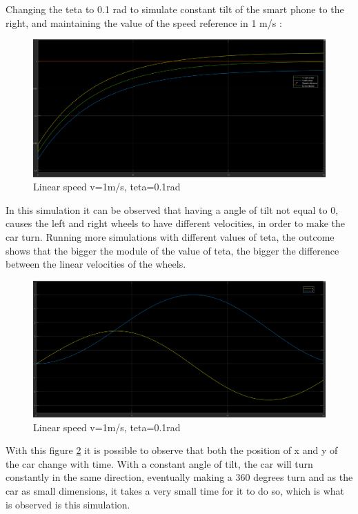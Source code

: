 Changing the teta to 0.1 rad to simulate constant tilt of the smart phone to the right, and maintaining the value of the speed reference in 1 m/s :\\
\newpage
\begin{figure}[!ht]
\centering
\includegraphics[width=1.0\textwidth]{./img/vel101.PNG}
\caption {\label{fig:sim2 - vel}Linear speed v=1m/s, teta=0.1rad}
\end{figure}
In this simulation it can be observed that having a angle of tilt not equal to 0, causes the left and right wheels to have different velocities, in order to make the car turn. Running more simulations with different values of teta, the outcome shows that the bigger the module of the value of teta, the bigger the difference between the linear velocities of the wheels.
\newpage
\begin{figure}[!ht]
\centering
\includegraphics[width=1.0\textwidth]{./img/xy101.PNG}
\caption {\label{fig:sim2 - pos}Linear speed v=1m/s, teta=0.1rad}
\end{figure}
With this figure \ref{fig:sim2 - pos} it is possible to observe that both the position of x and y of the car change with time. With a constant angle of tilt, the car will turn constantly in the same direction, eventually making a 360 degrees turn and as the car as small dimensions, it takes a very small time for it to do so, which is what is observed is this simulation.